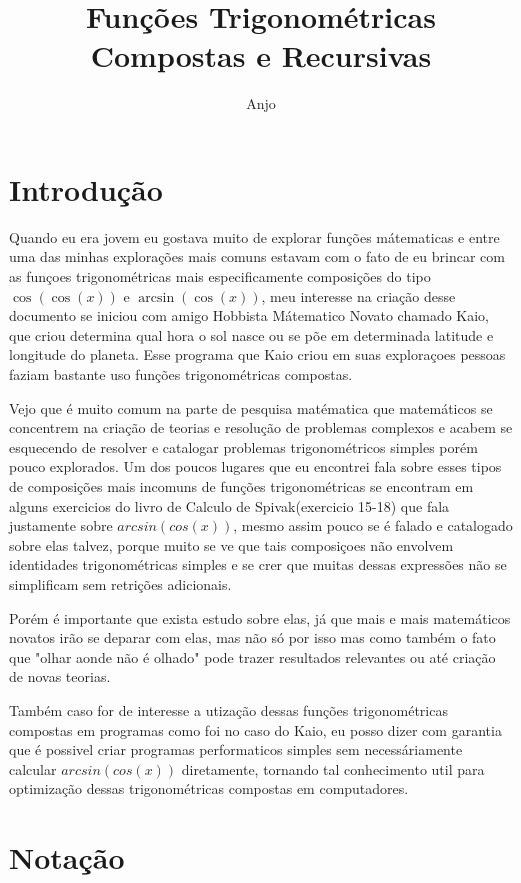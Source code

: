 \documentclass{article}
\author{Anjo}
\begin{document}
\title{Funções Trigonométricas Compostas e Recursivas}
\sloppy
\maketitle

\section{Introdução}
Quando eu era jovem eu gostava muito de explorar
funções mátematicas e entre uma das minhas explorações mais comuns estavam
com o fato de eu brincar com as funçoes trigonométricas mais especificamente
composições do tipo $\cos(\cos(x))$ e $\arcsin(\cos(x))$, meu interesse na criação desse documento se 
iniciou com amigo Hobbista Mátematico Novato chamado Kaio, que criou determina
qual hora o sol nasce ou se põe em determinada latitude e longitude do planeta.
Esse programa que Kaio criou em suas exploraçoes pessoas faziam bastante uso funções trigonométricas compostas.

Vejo que é muito comum na parte de pesquisa matématica que matemáticos se concentrem na criação de teorias e resolução de problemas complexos
e acabem se esquecendo de resolver e catalogar problemas trigonométricos simples porém pouco explorados. Um dos poucos lugares que eu encontrei fala sobre esses tipos de composições mais incomuns de funções trigonométricas se
encontram em alguns exercicios do livro de Calculo de Spivak(exercicio 15-18) que fala justamente sobre $arcsin(cos(x))$, mesmo assim pouco se é falado e catalogado sobre elas
talvez, porque muito se ve que tais composiçoes não envolvem identidades trigonométricas simples e se crer que muitas dessas expressões não se simplificam sem retrições adicionais.

Porém é importante que exista estudo sobre elas, já que mais e mais matemáticos novatos irão se deparar com elas, mas não só por isso mas como também o fato que "olhar aonde não é olhado" 
pode trazer resultados relevantes ou até criação de novas teorias. 

Também caso for de interesse a utização dessas funções trigonométricas compostas em programas
como foi no caso do Kaio, eu posso dizer com garantia que é possivel criar programas performaticos simples sem necessáriamente calcular $arcsin(cos(x))$ 
diretamente, tornando tal conhecimento util para optimização dessas trigonométricas compostas em computadores.

\section{Notação}
\end{document}
